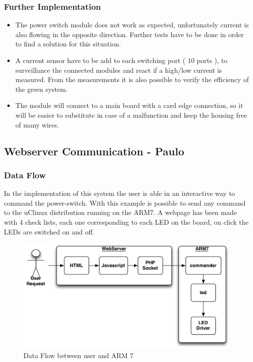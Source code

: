 \subsubsection{Further Implementation}
\begin{itemize}
	\item The power switch module does not work as expected, unfortunately current is also flowing in the opposite direction. Further tests have to be done in order to find a solution for this situation.
	\item A current sensor have to be add to each switching port ( 10 ports ), to surveillance the connected modules and react if a high\//low current is measured. From the measurements it is also possible to verify the efficiency of the green system.
	\item The module will connect to a main board with a card edge connection, so it will be easier to substitute in case of a malfunction and keep the housing free of many wires.
\end{itemize}


\subsection{Webserver Communication - Paulo}

\subsubsection{Data Flow}
In the implementation of this system the user is able in an interactive way to command the power-switch. With this example is possible to send any command to the uClinux distribution running on the ARM7.
A webpage has been made with 4 check lists, each one corresponding to each LED on the board,  on click the LEDs are switched on and off.
\begin{figure}[H]
	\begin{centering}
		 \includegraphics[width=1.0\textwidth,page=1]{content/appendix/eudp/images/dataflowPHP.pdf}
		\caption{Data Flow between user and ARM 7}
	\end{centering}
\end{figure}

